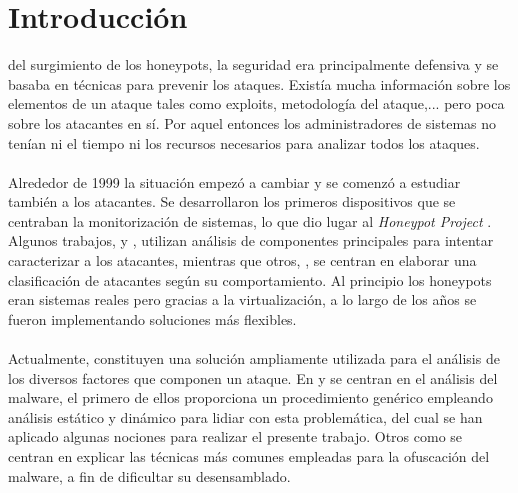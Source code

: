 \documentclass[journal]{IEEEtran}
\begin{document}
%
\IEEEpeerreviewmaketitle



\section{Introducción}
 del surgimiento de los honeypots, la seguridad era principalmente defensiva y se basaba en técnicas para prevenir los ataques. Existía mucha información sobre los elementos de un ataque tales como exploits, metodología del ataque,... pero poca sobre los atacantes en sí. Por aquel entonces los administradores de sistemas no tenían ni el tiempo ni los recursos necesarios para analizar todos los ataques.
\\\\
Alrededor de 1999 la situación empezó a cambiar y se comenzó a estudiar también a los atacantes. Se desarrollaron los primeros dispositivos que se centraban la monitorización de sistemas, lo que dio lugar al {\it Honeypot Project} \cite{honeynet.project}. Algunos trabajos, \cite{almotairi2008characterization} y \cite{almotairi2009technique}, utilizan análisis de componentes principales para intentar caracterizar a los atacantes, mientras que otros, \cite{salles2011characterizing}, se centran en elaborar una clasificación de atacantes según su comportamiento. Al principio los honeypots eran sistemas reales pero gracias a la virtualización, a lo largo de los años se fueron implementando soluciones más flexibles.
\\\\
Actualmente, constituyen una solución ampliamente utilizada para el análisis de los diversos factores que componen un ataque. En \cite{kendall2007practical} y \cite{quist2009visualizing} se centran en el análisis del malware, el primero de ellos proporciona un procedimiento genérico empleando análisis estático y dinámico para lidiar con esta problemática, del cual se han aplicado algunas nociones para realizar el presente trabajo. Otros como \cite{ofuscation} se centran en explicar las técnicas más comunes empleadas para la ofuscación del malware, a fin de dificultar su desensamblado.
\end{document}
